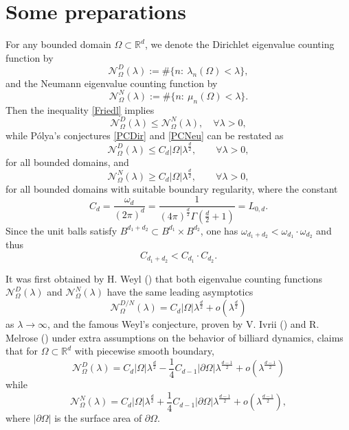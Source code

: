 \documentclass[11pt,letterpaper]{amsart}
\numberwithin{equation}{section}
\theoremstyle{plain}
\theoremstyle{plain}
\numberwithin{equation}{section}
\theoremstyle{remark}
\begin{document}
	
	
	\section{Some preparations}\label{secpre}
	
	

	
	For any bounded domain $\Omega \subset \mathbb R^d$, we denote the   Dirichlet eigenvalue counting function by
	\[
	\mathcal{N}^D_\Omega(\lambda):=\#\{n:\ \lambda_n(\Omega)< \lambda\},
	\]
	and the  Neumann eigenvalue counting function by
	\[ 
	\mathcal{N}^N_\Omega(\lambda):=\#\{n:\ \mu_n(\Omega)< \lambda\}.
	\]
	Then the inequality \eqref{Friedl} implies
	\[\mathcal{N}^D_\Omega(\lambda) \le \mathcal{N}^N_\Omega(\lambda), \quad \forall \lambda>0,\]
	while P\'olya's conjectures \eqref{PCDir} and \eqref{PCNeu}  can be restated as 
	\begin{equation}\label{PolConjD}
		\mathcal{N}^D_\Omega(\lambda)\le C_d |\Omega| \lambda^{\frac{d}{2}},\qquad \forall \lambda>0,
	\end{equation}
	for all bounded domains, and 
	\begin{equation}\label{PolConjN}
		\mathcal{N}^N_\Omega(\lambda)\ge C_d |\Omega| \lambda^{\frac{d}{2}},\qquad \forall \lambda>0,
	\end{equation}
	for all bounded domains with suitable boundary regularity, 
	where the constant
	\begin{equation}\label{Cd}
		C_d=\frac{\omega_d}{(2\pi)^{d}}=\frac{1}{(4\pi)^{\frac{d}{2}}\Gamma(\frac{d}{2}+1)}=L_{0,d}. 
	\end{equation}
	Since the unit balls satisfy $B^{d_1+d_2} \subset   B^{d_1}\times   B^{d_2}$, one has $\omega_{d_1+d_2}<\omega_{d_1}\cdot \omega_{d_2}$ and thus 
	\begin{equation}\label{Gampri}
		C_{d_1+d_2}< C_{d_1}\cdot C_{d_2}.
	\end{equation}
	
	It was first obtained by H. Weyl (\cite{W})  that both eigenvalue counting functions $\mathcal{N}^D_\Omega(\lambda)$ and $\mathcal{N}^N_\Omega(\lambda)$ have the same leading asymptotics 
	\begin{equation}\label{Weyl001} 
		\mathcal{N}^{D/N}_\Omega(\lambda) = C_d |\Omega| \lambda^{\frac d2}+o(\lambda^{\frac{d}2})
	\end{equation}
	as $\lambda \to \infty$, and the famous Weyl's conjecture, proven by V. Ivrii (\cite{Iv}) and R. Melrose (\cite{Mel}) under extra assumptions on the behavior of billiard dynamics, claims that for $\Omega \subset \mathbb R^d$ with piecewise smooth boundary, 
	\[\mathcal{N}^{D}_\Omega(\lambda) = C_d |\Omega| \lambda^{\frac d2} - \frac{1}{4} C_{d-1}|\partial \Omega|\lambda^{\frac{d-1}2}+o(\lambda^{\frac{d-1}2})\]
	while
	\[\mathcal{N}^{N}_\Omega(\lambda) = C_d |\Omega| \lambda^{\frac d2}+ \frac{1}{4} C_{d-1}|\partial \Omega|\lambda^{\frac{d-1}2}+o(\lambda^{\frac{d-1}2}),\]
	where $|\partial \Omega|$ is the surface area of $\partial \Omega$. 
	
\end{document}
